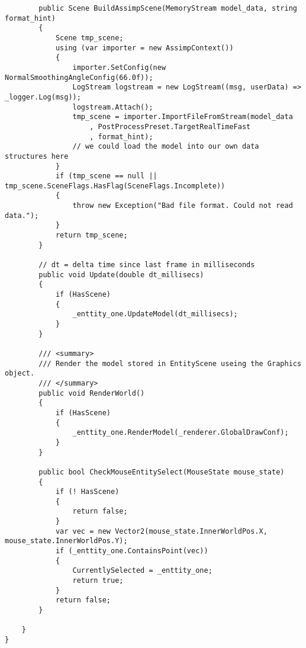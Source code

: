 \begin{scriptsize}
\begin{verbatim}
        public Scene BuildAssimpScene(MemoryStream model_data, string format_hint)
        {
            Scene tmp_scene;
            using (var importer = new AssimpContext())
            {
                importer.SetConfig(new NormalSmoothingAngleConfig(66.0f));
                LogStream logstream = new LogStream((msg, userData) => _logger.Log(msg));
                logstream.Attach();
                tmp_scene = importer.ImportFileFromStream(model_data
                    , PostProcessPreset.TargetRealTimeFast
                    , format_hint);
                // we could load the model into our own data structures here
            }
            if (tmp_scene == null || tmp_scene.SceneFlags.HasFlag(SceneFlags.Incomplete))
            {
                throw new Exception("Bad file format. Could not read data.");
            }
            return tmp_scene;
        }

        // dt = delta time since last frame in milliseconds
        public void Update(double dt_millisecs)
        {
            if (HasScene)
            {
                _enttity_one.UpdateModel(dt_millisecs);
            }
        }

        /// <summary>
        /// Render the model stored in EntityScene useing the Graphics object.
        /// </summary>
        public void RenderWorld()
        {
            if (HasScene)
            {
                _enttity_one.RenderModel(_renderer.GlobalDrawConf);
            }
        }

        public bool CheckMouseEntitySelect(MouseState mouse_state)
        {
            if (! HasScene)
            {
                return false;
            }
            var vec = new Vector2(mouse_state.InnerWorldPos.X, mouse_state.InnerWorldPos.Y);
            if (_enttity_one.ContainsPoint(vec))
            {
                CurrentlySelected = _enttity_one;
                return true;
            }
            return false;
        }

    }
}

\end{verbatim}
\end{scriptsize}
